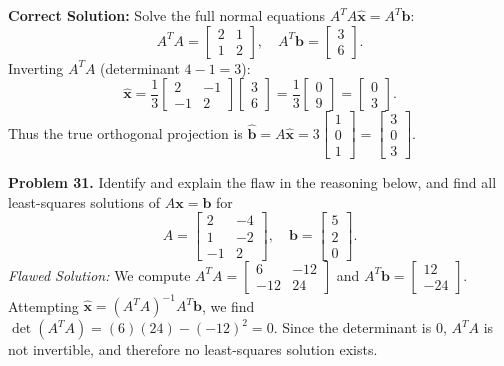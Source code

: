 \documentclass[11pt, letterpaper]{article}
\theoremstyle{definition}
\theoremstyle{remark}
\begin{document}
\textbf{Correct Solution:} Solve the full normal equations $A^T A \hat{\mathbf{x}} = A^T \mathbf{b}$:
\[
A^T A = \begin{bmatrix} 2 & 1 \\ 1 & 2 \end{bmatrix}, \quad A^T \mathbf{b} = \begin{bmatrix} 3 \\ 6 \end{bmatrix}.
\]
Inverting $A^T A$ (determinant $4 - 1 = 3$):
\[
\hat{\mathbf{x}} = \frac{1}{3} \begin{bmatrix} 2 & -1 \\ -1 & 2 \end{bmatrix} \begin{bmatrix} 3 \\ 6 \end{bmatrix} = \frac{1}{3} \begin{bmatrix} 0 \\ 9 \end{bmatrix} = \begin{bmatrix} 0 \\ 3 \end{bmatrix}.
\]
Thus the true orthogonal projection is $\hat{\mathbf{b}} = A\hat{\mathbf{x}} = 3\begin{bmatrix} 1 \\ 0 \\ 1 \end{bmatrix} = \begin{bmatrix} 3 \\ 0 \\ 3 \end{bmatrix}$.

\textbf{Problem 31.} Identify and explain the flaw in the reasoning below, and find all least-squares solutions of $A\mathbf{x} = \mathbf{b}$ for
\[
A = \begin{bmatrix} 2 & -4 \\ 1 & -2 \\ -1 & 2 \end{bmatrix}, \quad \mathbf{b} = \begin{bmatrix} 5 \\ 2 \\ 0 \end{bmatrix}.
\]
\textit{Flawed Solution:} We compute $A^T A = \begin{bmatrix} 6 & -12 \\ -12 & 24 \end{bmatrix}$ and $A^T \mathbf{b} = \begin{bmatrix} 12 \\ -24 \end{bmatrix}$. Attempting $\hat{\mathbf{x}} = (A^T A)^{-1} A^T \mathbf{b}$, we find $\det(A^T A) = (6)(24) - (-12)^2 = 0$. Since the determinant is $0$, $A^T A$ is not invertible, and therefore no least-squares solution exists.
\end{document}
